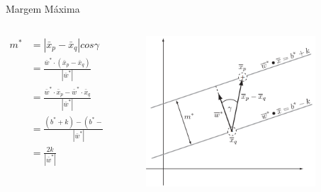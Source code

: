 \documentclass{beamer}
\begin{document}
\begin{frame}{Margem Máxima}
\begin{columns}
    \begin{column}{.49\textwidth}
        \begin{equation}
        \begin{split}
        m^* &= |\bar{x}_p-\bar{x}_q|cos\gamma\\
            &= \frac{\bar{w}^*\cdot(\bar{x}_p-\bar{x}_q)}{|\bar{w}^*|}\\
            &= \frac{\bar{w}^*\cdot\bar{x}_p-\bar{w}^*\cdot\bar{x}_q}{|\bar{w}^*|}\\
            &= \frac{(b^*+k)-(b^*-k)}{|\bar{w}^*|}\\
            &= \frac{2k}{|\bar{w}^*|}
        \end{split}
        \end{equation}
    \end{column}
    \begin{column}{.49\textwidth}
    \begin{figure}
      \centering
      \includegraphics[width=0.9\textwidth]{svm_4.png}
    \end{figure}
    \end{column}
\end{columns}
\end{frame}
\end{document}

